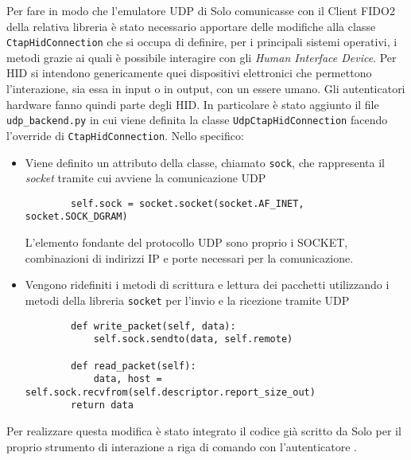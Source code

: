 Per fare in modo che l'emulatore UDP di Solo comunicasse con il Client FIDO2 della relativa libreria è stato necessario apportare delle modifiche alla classe \verb*|CtapHidConnection| che si occupa di definire, per i principali sistemi operativi, i metodi grazie ai quali è possibile interagire con gli \emph{Human Interface Device}. Per HID si intendono genericamente quei dispositivi elettronici che permettono l'interazione, sia essa in input o in output, con un essere umano. Gli autenticatori hardware fanno quindi parte degli HID. 
In particolare è stato aggiunto il file \verb*|udp_backend.py| in cui viene definita la classe \verb*|UdpCtapHidConnection| facendo l'override di \verb*|CtapHidConnection|. Nello specifico:
\begin{itemize}
	\item Viene definito un attributo della classe, chiamato \verb*|sock|, che rappresenta il \emph{socket} tramite cui avviene la comunicazione UDP
	\begin{verbatim}
		self.sock = socket.socket(socket.AF_INET, socket.SOCK_DGRAM)
	\end{verbatim}
	L'elemento fondante del protocollo UDP sono proprio i SOCKET, combinazioni di indirizzi IP e porte necessari per la comunicazione.
	\item Vengono ridefiniti i metodi di scrittura e lettura dei pacchetti utilizzando i metodi della libreria \verb*|socket| per l'invio e la ricezione tramite UDP
	\begin{verbatim}
        def write_packet(self, data):
            self.sock.sendto(data, self.remote)
		
        def read_packet(self):
            data, host = self.sock.recvfrom(self.descriptor.report_size_out)
        return data
	\end{verbatim}
\end{itemize}
Per realizzare questa modifica è stato integrato il codice già scritto da Solo per il proprio strumento di interazione a riga di comando con l'autenticatore \cite{solo1-cli:udp_backend}.